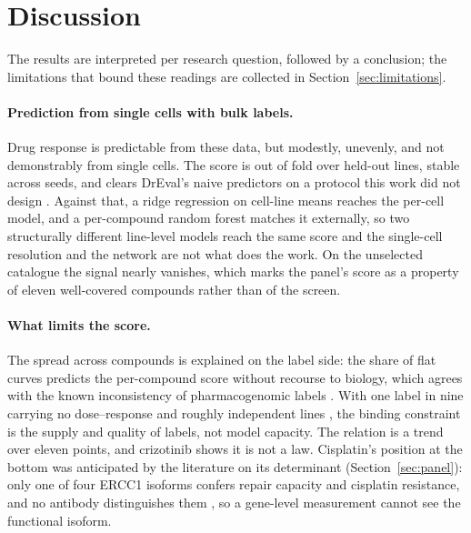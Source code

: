 \section{Discussion}
\label{sec:discussion}

The results are interpreted per research question, followed by a conclusion; the limitations that
bound these readings are collected in Section~\ref{sec:limitations}.

\paragraph{Prediction from single cells with bulk labels.} Drug response is predictable from these data,
but modestly, unevenly, and not demonstrably from single cells. The score is out of fold over held-out
lines, stable across seeds, and clears DrEval's naive predictors on a protocol this work did not design
\cite{dreval}. Against that, a ridge regression on cell-line means \cite{hoerl1970} reaches the per-cell model, and
a per-compound random forest \cite{breiman2001} matches it externally, so two structurally different line-level models reach the
same score and the single-cell resolution and the network are not what does the work. On the unselected catalogue the signal nearly vanishes, which marks the
panel's score as a property of eleven well-covered compounds rather than of the screen.

\paragraph{What limits the score.} The spread across compounds is explained on the label side: the share
of flat curves predicts the per-compound score without recourse to biology, which agrees with the known
inconsistency of pharmacogenomic labels \cite{haibekains2013,bayer2023curvecurator}. With one label in nine
carrying no dose--response and roughly \NLinesCV{} independent lines \cite{lazic2010,dreval}, the binding constraint is the
supply and quality of labels, not model capacity. The relation is a trend over eleven points,
and crizotinib shows it is not a law. Cisplatin's position at the bottom was anticipated by the
literature on its determinant (Section~\ref{sec:panel}): only one of four ERCC1 isoforms confers repair
capacity and cisplatin resistance, and no antibody distinguishes them \cite{friboulet_ercc1}, so a
gene-level measurement cannot see the functional isoform.

